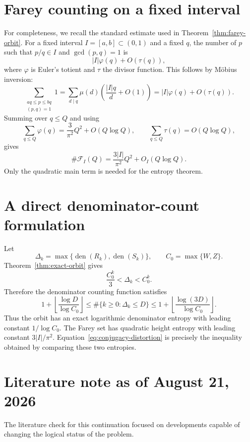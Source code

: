\documentclass[11pt]{article}
\theoremstyle{definition}
\theoremstyle{remark}
\newcommand{\den}{\operatorname{den}}
\begin{document}
\appendix

\section{Farey counting on a fixed interval}
\label{app:farey}

For completeness, we recall the standard estimate used in
Theorem~\ref{thm:farey-orbit}.  For a fixed interval $I=[a,b]\subset(0,1)$ and a fixed
$q$, the number of $p$ such that $p/q\in I$ and $\gcd(p,q)=1$ is
\[
 |I|\varphi(q)+O(\tau(q)),
\]
where $\varphi$ is Euler's totient and $\tau$ the divisor function.  This follows by
M\"obius inversion:
\[
 \sum_{\substack{aq\le p\le bq\\(p,q)=1}}1
 =\sum_{d\mid q}\mu(d)
   \left(\frac{|I|q}{d}+O(1)\right)
 =|I|\varphi(q)+O(\tau(q)).
\]
Summing over $q\le Q$ and using
\[
 \sum_{q\le Q}\varphi(q)=\frac{3}{\pi^2}Q^2+O(Q\log Q),
 \qquad
 \sum_{q\le Q}\tau(q)=O(Q\log Q),
\]
gives
\[
 \#\mathcal F_I(Q)=\frac{3|I|}{\pi^2}Q^2+O_I(Q\log Q).
\]
Only the quadratic main term is needed for the entropy theorem.

\section{A direct denominator-count formulation}
\label{app:den-count}

Let
\[
 \Delta_k=\max\{\den(R_k),\den(S_k)\},
 \qquad C_0=\max\{W,Z\}.
\]
Theorem~\ref{thm:exact-orbit} gives
\[
 \frac{C_0^k}{3}<\Delta_k<C_0^k.
\]
Therefore the denominator counting function satisfies
\begin{equation}
 1+\left\lfloor\frac{\log D}{\log C_0}\right\rfloor
 \le
 \#\{k\ge0:\Delta_k\le D\}
 \le
 1+\left\lfloor\frac{\log(3D)}{\log C_0}\right\rfloor.
 \label{eq:den-count-direct}
\end{equation}
Thus the orbit has an exact logarithmic denominator entropy with leading constant
$1/\log C_0$.  The Farey set has quadratic height entropy with leading constant
$3|I|/\pi^2$.  Equation~\eqref{eq:conjugacy-distortion} is precisely the inequality obtained
by comparing these two entropies.

\section{Literature note as of August 21, 2026}
\label{app:literature}

The literature check for this continuation focused on developments capable of changing the
logical status of the problem.
\end{document}

